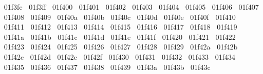 {  ^^^^^^01f3fe%
  ^^^^^^01f3ff%
  ^^^^^^01f400%
  ^^^^^^01f401%
  ^^^^^^01f402%
  ^^^^^^01f403%
  ^^^^^^01f404%
  ^^^^^^01f405%
  ^^^^^^01f406%
  ^^^^^^01f407%
  ^^^^^^01f408%
  ^^^^^^01f409%
  ^^^^^^01f40a%
  ^^^^^^01f40b%
  ^^^^^^01f40c%
  ^^^^^^01f40d%
  ^^^^^^01f40e%
  ^^^^^^01f40f%
  ^^^^^^01f410%
  ^^^^^^01f411%
  ^^^^^^01f412%
  ^^^^^^01f413%
  ^^^^^^01f414%
  ^^^^^^01f415%
  ^^^^^^01f416%
  ^^^^^^01f417%
  ^^^^^^01f418%
  ^^^^^^01f419%
  ^^^^^^01f41a%
  ^^^^^^01f41b%
  ^^^^^^01f41c%
  ^^^^^^01f41d%
  ^^^^^^01f41e%
  ^^^^^^01f41f%
  ^^^^^^01f420%
  ^^^^^^01f421%
  ^^^^^^01f422%
  ^^^^^^01f423%
  ^^^^^^01f424%
  ^^^^^^01f425%
  ^^^^^^01f426%
  ^^^^^^01f427%
  ^^^^^^01f428%
  ^^^^^^01f429%
  ^^^^^^01f42a%
  ^^^^^^01f42b%
  ^^^^^^01f42c%
  ^^^^^^01f42d%
  ^^^^^^01f42e%
  ^^^^^^01f42f%
  ^^^^^^01f430%
  ^^^^^^01f431%
  ^^^^^^01f432%
  ^^^^^^01f433%
  ^^^^^^01f434%
  ^^^^^^01f435%
  ^^^^^^01f436%
  ^^^^^^01f437%
  ^^^^^^01f438%
  ^^^^^^01f439%
  ^^^^^^01f43a%
  ^^^^^^01f43b%
  ^^^^^^01f43c%
}
